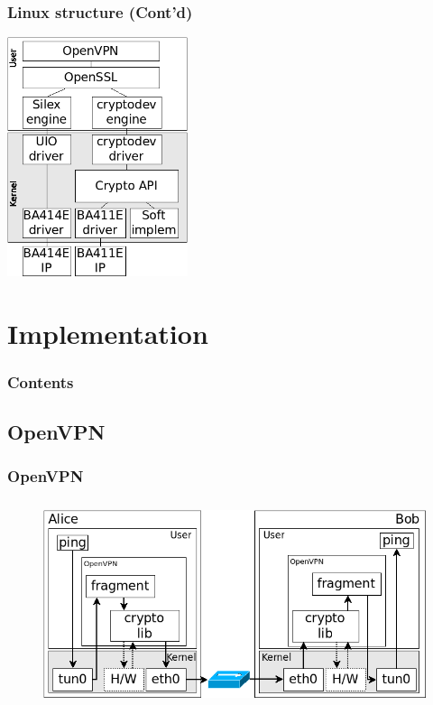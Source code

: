 \documentclass[xcolor={x11names, rgb, usenames, dvipsnames}]{beamer}
\begin{document}
\begin{frame}
\frametitle{Linux structure (Cont'd)}
	\begin{center}
	\includegraphics[height=7cm]{os-path-specific.png}
	\end{center}
\end{frame}





\section{Implementation}
\begin{frame}
\frametitle{Contents}
\tableofcontents[%
	currentsection,
	sectionstyle=show/shaded,
	subsectionstyle=show/show/hide,
	]
\end{frame}

\subsection{OpenVPN}
\begin{frame}
\frametitle{OpenVPN}
	\begin{figure}
	\includegraphics[height=6cm]{openvpn-transfer.png}
	\end{figure}
\end{frame}
\end{document}
